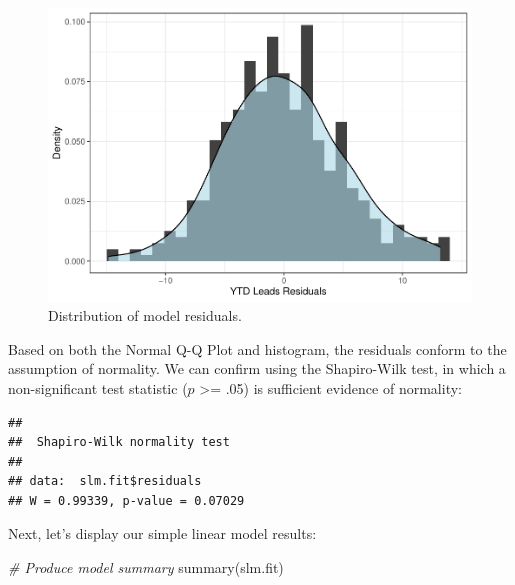 \documentclass[
]{book}
\newenvironment{Shaded}{\begin{snugshade}}{\end{snugshade}}
\newcommand{\CommentTok}[1]{\textcolor[rgb]{0.56,0.35,0.01}{\textit{#1}}}
\newcommand{\FunctionTok}[1]{\textcolor[rgb]{0.00,0.00,0.00}{#1}}
\newcommand{\NormalTok}[1]{#1}
\newcommand{\SpecialCharTok}[1]{\textcolor[rgb]{0.00,0.00,0.00}{#1}}
\begin{document}
\begin{figure}

{\centering \includegraphics{The_Fundamentals_of_People_Analytics_files/figure-latex/slm-residuals-1} 

}

\caption{Distribution of model residuals.}\label{fig:slm-residuals}
\end{figure}

Based on both the Normal Q-Q Plot and histogram, the residuals conform to the assumption of normality. We can confirm using the Shapiro-Wilk test, in which a non-significant test statistic (\(p\) \textgreater= .05) is sufficient evidence of normality:

\begin{Shaded}
\end{Shaded}

\begin{verbatim}
## 
##  Shapiro-Wilk normality test
## 
## data:  slm.fit$residuals
## W = 0.99339, p-value = 0.07029
\end{verbatim}

Next, let's display our simple linear model results:

\begin{Shaded}
\begin{Highlighting}[]
\CommentTok{\# Produce model summary}
\FunctionTok{summary}\NormalTok{(slm.fit)}
\end{Highlighting}
\end{Shaded}
\end{document}
